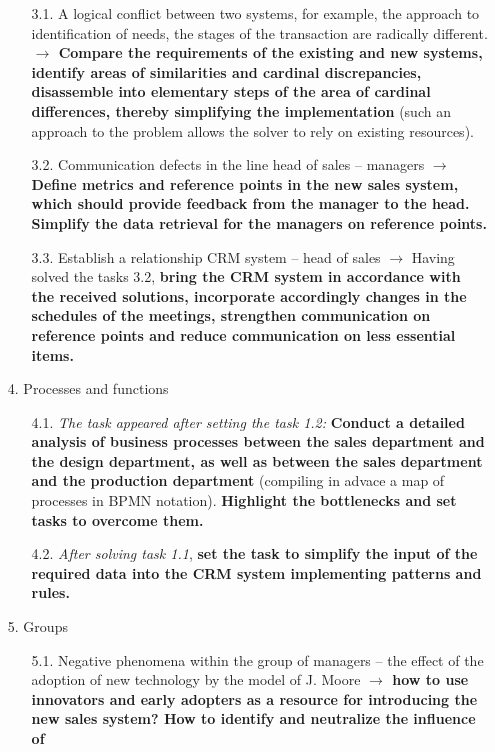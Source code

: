 \documentclass[11pt,a4paper]{book}
\begin{document}
\begin{itemize}
\begin{itemize}
  \item [3.1.] A logical conflict between two systems, for example, the
    approach to identification of needs, the stages of the transaction are
    radically different. \textbf{$\to$ Compare the requirements of the
      existing and new systems, identify areas of similarities and cardinal
      discrepancies, disassemble into elementary steps of the area of cardinal
      differences, thereby simplifying the implementation} (such an approach
    to the problem allows the solver to rely on existing resources).
  \item [3.2.] Communication defects in the line head of sales -- managers
    \textbf{$\to$ Define metrics and reference points in the new sales system,
      which should provide feedback from the manager to the head. Simplify the
      data retrieval for the managers on reference points.}
  \item [3.3.] Establish a relationship CRM system -- head of sales $\to$
    Having solved the tasks 3.2, \textbf{bring the CRM system in accordance
      with the received solutions, incorporate accordingly changes in the
      schedules of the meetings, strengthen communication on reference points
      and reduce communication on less essential items.}
  \end{itemize}
\item [4.] Processes and functions
  \begin{itemize}
  \item [4.1.] \emph{The task appeared after setting the task 1.2:}
    \textbf{Conduct a detailed analysis of business processes between the
      sales department and the design department, as well as between the sales
      department and the production department} (compiling in advace a map of
    processes in BPMN notation). \textbf{Highlight the bottlenecks and set
      tasks to overcome them.}
  \item [4.2.]  \emph{After solving task 1.1}, \textbf{set the task to
    simplify the input of the required data into the CRM system implementing
    patterns and rules.}
  \end{itemize}
\item [5.] Groups
  \begin{itemize}
  \item [5.1.] Negative phenomena within the group of managers -- the effect
    of the adoption of new technology by the model of J. Moore \textbf{$\to$
      how to use innovators and early adopters as a resource for introducing
      the new sales system? How to identify and neutralize the influence of
}
\end{itemize}
\end{itemize}
\end{document}
